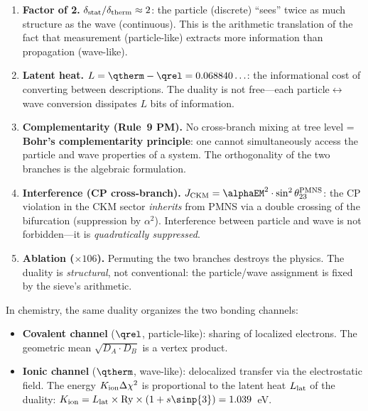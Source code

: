 \documentclass[12pt,a4paper]{article}
\begin{document}
\begin{enumerate}[nosep]
\item \textbf{Factor of 2.} $\delta_{\rm stat}/\delta_{\rm therm}
  \approx 2$: the particle (discrete) ``sees'' twice as much structure
  as the wave (continuous). This is the arithmetic translation of the
  fact that measurement (particle-like) extracts more information than
  propagation (wave-like).

\item \textbf{Latent heat.} $L = \qtherm - \qrel = 0.068840\ldots$:
  the informational cost of converting between descriptions. The
  duality is not free---each particle$\leftrightarrow$wave conversion
  dissipates $L$ bits of information.

\item \textbf{Complementarity (Rule~9 PM).} No cross-branch mixing at
  tree level = \textbf{Bohr's complementarity principle}: one cannot
  simultaneously access the particle and wave properties of a system.
  The orthogonality of the two branches is the algebraic formulation.

\item \textbf{Interference (CP cross-branch).}
  $J_{\rm CKM} = \alphaEM^2 \cdot \sin^2\theta_{23}^{\rm PMNS}$:
  the CP violation in the CKM sector \emph{inherits} from PMNS via
  a double crossing of the bifurcation (suppression by $\alpha^2$).
  Interference between particle and wave is not forbidden---it is
  \emph{quadratically suppressed}.

\item \textbf{Ablation ($\times 106$).} Permuting the two branches
  destroys the physics. The duality is \emph{structural}, not
  conventional: the particle/wave assignment is fixed by the sieve's
  arithmetic.
\end{enumerate}

\begin{remark}
\label{rem:ch9_chemistry_CO}
In chemistry, the same duality organizes the two bonding channels:
\begin{itemize}[nosep]
\item \textbf{Covalent channel} ($\qrel$, particle-like): sharing of
  localized electrons. The geometric mean $\sqrt{D_A \cdot D_B}$ is a
  vertex product.
\item \textbf{Ionic channel} ($\qtherm$, wave-like): delocalized transfer
  via the electrostatic field. The energy $K_{\rm ion}\Delta\chi^2$ is
  proportional to the latent heat $L_{\rm lat}$ of the duality:
  $K_{\rm ion} = L_{\rm lat} \times \mathrm{Ry} \times (1 + s\sinp{3})
  = 1.039$~eV.
\end{itemize}
\end{remark}
\end{document}
